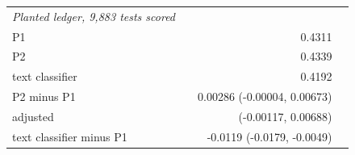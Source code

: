 \begin{tabular}{lrrr}
\midrule
\emph{Planted ledger, 9,883 tests scored} &  &  &  \\
P1 &  & 0.4311 &  \\
P2 &  & 0.4339 &  \\
text classifier &  & 0.4192 &  \\
P2 minus P1 &  & 0.00286 (-0.00004, 0.00673) &  \\
\quad adjusted &  & (-0.00117, 0.00688) &  \\
text classifier minus P1 &  & -0.0119 (-0.0179, -0.0049) &  \\

\end{tabular}
